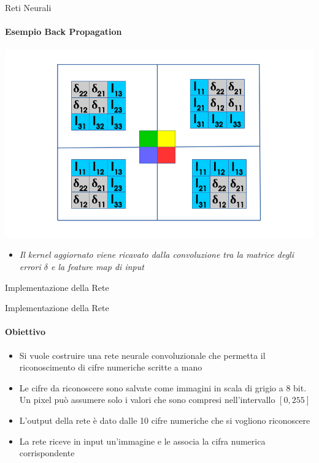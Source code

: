 \documentclass[
 ]{beamer}
\begin{document}
\begin{frame}{Reti Neurali}
    \framesubtitle{Esempio Back Propagation} 
    
    \begin{center}
      \includegraphics[scale = 0.4]{back_conv3.png}
    \end{center}
        
    \begin{itemize}
        \setlength\itemsep{1em}
        \item[] \large \emph{Il kernel aggiornato viene ricavato dalla convoluzione tra la matrice degli errori $\delta$ e la feature map di input}
    \end{itemize}
\end{frame}   

\begin{frame}[c]
  \centering
  \bigskip \bigskip    
  \Huge Implementazione della Rete
\end{frame}

\begin{frame}{Implementazione della Rete}
    \framesubtitle{Obiettivo}
    \begin{itemize} [<+->]
        \setlength\itemsep{2em}
        \item \large Si vuole costruire una rete neurale convoluzionale che permetta il riconoscimento di cifre numeriche scritte a mano
        \item \large Le cifre da riconoscere sono salvate come immagini in scala di grigio a 8 bit. Un pixel può assumere solo i valori che sono compresi nell'intervallo $[0,255]$
        \item \large L'output della rete è dato dalle 10 cifre numeriche che si vogliono riconoscere
        \item \large La rete riceve in input un'immagine e le associa la cifra numerica corrispondente
    \end{itemize}
\end{frame}
\end{document}
